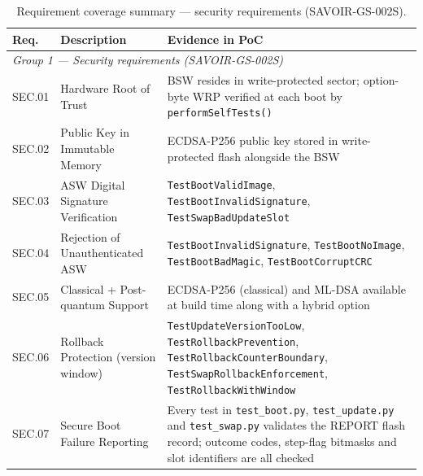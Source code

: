 \begin{table}[H]
\centering
\small
\begin{tabular}{|l|p{5cm}|p{5cm}|}
\hline
\textbf{Req.} & \textbf{Description} & \textbf{Evidence in PoC} \\
\hline
\multicolumn{3}{|l|}{\textit{Group 1 — Security requirements (SAVOIR-GS-002S)}} \\
\hline
SEC.01 & Hardware Root of Trust & BSW resides in write-protected sector; option-byte WRP verified at each boot by \texttt{performSelfTests()} \\
\hline
SEC.02 & Public Key in Immutable Memory & ECDSA-P256 public key stored in write-protected flash alongside the BSW \\
\hline
SEC.03 & ASW Digital Signature Verification & \texttt{TestBootValidImage}, \texttt{TestBootInvalidSignature}, \texttt{TestSwapBadUpdateSlot} \\
\hline
SEC.04 & Rejection of Unauthenticated ASW & \texttt{TestBootInvalidSignature}, \texttt{TestBootNoImage}, \texttt{TestBootBadMagic}, \texttt{TestBootCorruptCRC} \\
\hline
SEC.05 & Classical + Post-quantum Support & ECDSA-P256 (classical) and ML-DSA available at build time along with a hybrid option \\
\hline
SEC.06 & Rollback Protection (version window) & \texttt{TestUpdateVersionTooLow}, \texttt{TestRollbackPrevention}, \texttt{TestRollbackCounterBoundary}, \texttt{TestSwapRollbackEnforcement}, \texttt{TestRollbackWithWindow} \\
\hline
SEC.07 & Secure Boot Failure Reporting & Every test in \texttt{test\_boot.py}, \texttt{test\_update.py} and \texttt{test\_swap.py} validates the REPORT flash record; outcome codes, step-flag bitmasks and slot identifiers are all checked \\
\hline
\end{tabular}
\caption{Requirement coverage summary — security requirements (SAVOIR-GS-002S).}
\label{tab:req-verification-sec}
\end{table}


